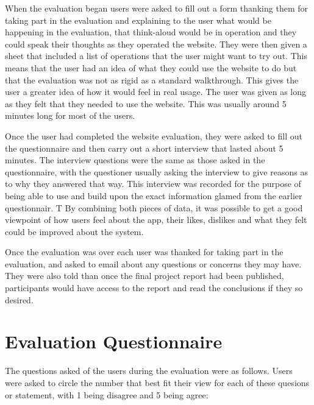\documentclass{l4proj}
\begin{document}
When the evaluation began users were asked to fill out a form thanking them for taking part in the evaluation and explaining to the user what would be happening in the evaluation, that think-aloud would be in operation and they could speak their thoughts as they operated the website. They were then given a sheet that included a list of operations that the user might want to try out. This means that the user had an idea of what they could use the website to do but that the evaluation was not as rigid as a standard walkthrough. This gives the user a greater idea of how it would feel in real usage. The user was given as long as they felt that they needed to use the website. This was usually around 5 minutes long for most of the users.

Once the user had completed the website evaluation, they were asked to fill out the questionnaire and then carry out a short interview that lasted about 5 minutes. The interview questions were the same as those asked in the questionnaire, with the questioner usually asking the interview to give reasons as to why they answered that way. This interview was recorded for the purpose of being able to use and build upon the exact information glamed from the earlier questionnair. T By combining both pieces of data, it was possible to get a good viewpoint of how users feel about the app, their likes, dislikes and what they felt could be improved about the system.

Once the evaluation was over each user was thanked for taking part in the evaluation, and asked to email about any questions or concerns they may have. They were also told than once the final project report had been published, participants would have access to the report and read the conclusions if they so desired.

\section{Evaluation Questionnaire}

The questions asked of the users during the evaluation were as follows. Users were asked to circle the number that best fit their view for each of these quesions or statement, with 1 being disagree and 5 being agree:
\end{document}
